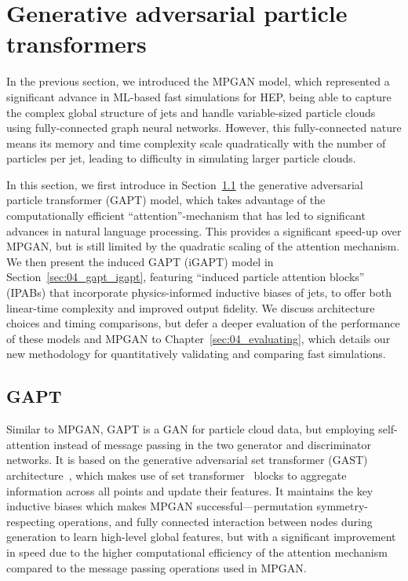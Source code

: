 \section{Generative adversarial particle transformers}
\label{sec:04_gapt}

In the previous section, we introduced the MPGAN model, which represented a significant advance in ML-based fast simulations for HEP, being able to capture the complex global structure of jets and handle variable-sized particle clouds using fully-connected graph neural networks.
However, this fully-connected nature means its memory and time complexity scale quadratically with the number of particles per jet, leading to difficulty in simulating larger particle clouds.

In this section, we first introduce in Section~\ref{sec:04_gapt_gapt} the generative adversarial particle transformer (GAPT) model, which takes advantage of the computationally efficient ``attention''-mechanism that has led to significant advances in natural language processing.
This provides a significant speed-up over MPGAN, but is still limited by the quadratic scaling of the attention mechanism.
We then present the induced GAPT (iGAPT) model in Section~\ref{sec:04_gapt_igapt}, featuring ``induced particle attention blocks'' (IPABs) that incorporate physics-informed inductive biases of jets, to offer both linear-time complexity and improved output fidelity.
We discuss architecture choices and timing comparisons, but defer a deeper evaluation of the performance of these models and MPGAN to Chapter~\ref{sec:04_evaluating}, which details our new methodology for quantitatively validating and comparing fast simulations.

\subsection{GAPT}
\label{sec:04_gapt_gapt}

Similar to MPGAN, GAPT is a GAN for particle cloud data, but employing self-attention instead of message passing in the two generator and discriminator networks.
It is based on the generative adversarial set transformer (GAST) architecture~\cite{stelzner2020generative}, which makes use of set transformer~\cite{lee2019set} blocks to aggregate information across all points and update their features. 
It maintains the key inductive biases which makes MPGAN successful---permutation symmetry-respecting operations, and fully connected interaction between nodes during generation to learn high-level global features, but with a significant improvement in speed due to the higher computational efficiency of the attention mechanism compared to the message passing operations used in MPGAN.

